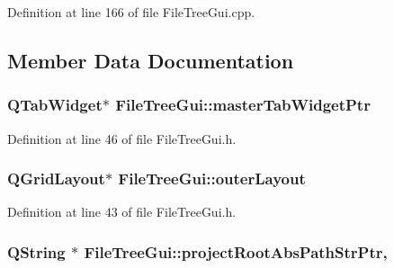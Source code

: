 Definition at line 166 of file File\-Tree\-Gui.\-cpp.



\subsection{Member Data Documentation}
\hypertarget{class_file_tree_gui_adb1e3ecfaab582317fcd9b968bbf6c40}{
\subsubsection[{master\-Tab\-Widget\-Ptr}]{\setlength{\rightskip}{0pt plus 5cm}Q\-Tab\-Widget$\ast$ File\-Tree\-Gui\-::master\-Tab\-Widget\-Ptr\hspace{0.3cm}{\ttfamily [private]}}}\label{class_file_tree_gui_adb1e3ecfaab582317fcd9b968bbf6c40}


Definition at line 46 of file File\-Tree\-Gui.\-h.

\hypertarget{class_file_tree_gui_aaf8b63a4775b1d46d635cdaef94b979a}{
\subsubsection[{outer\-Layout}]{\setlength{\rightskip}{0pt plus 5cm}Q\-Grid\-Layout$\ast$ File\-Tree\-Gui\-::outer\-Layout\hspace{0.3cm}{\ttfamily [private]}}}\label{class_file_tree_gui_aaf8b63a4775b1d46d635cdaef94b979a}


Definition at line 43 of file File\-Tree\-Gui.\-h.

\hypertarget{class_file_tree_gui_a9ce991f8f95f583aa5fb1bec7a9bcd4c}{
\subsubsection[{project\-Root\-Abs\-Path\-Str\-Ptr}]{\setlength{\rightskip}{0pt plus 5cm}Q\-String $\ast$ File\-Tree\-Gui\-::project\-Root\-Abs\-Path\-Str\-Ptr\hspace{0.3cm}{\ttfamily [static]}, {\ttfamily [private]}}}\label{class_file_tree_gui_a9ce991f8f95f583aa5fb1bec7a9bcd4c}


